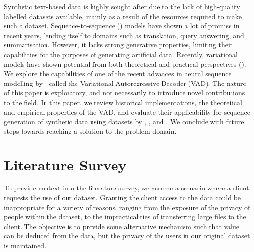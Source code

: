 \documentclass[12pt,twoside]{report}
\begin{document}
Synthetic text-based data is highly sought after due to the lack of high-quality labelled datasets available, mainly as a result of the resources required to make such a dataset.
Sequence-to-sequence (\cite{sutskever_sequence_2014}) models have shown a lot of promise in recent years, lending itself to domains such as translation, query answering, and summarisation. However, it lacks strong generative properties, limiting their capabilities for the purposes of generating artificial data.
Recently, variational models have shown potential from both theoretical and practical perspectives (\cite{kingma_auto-encoding_2013}). We explore the capabilities of one of the recent advances in neural sequence modelling by \cite{du_variational_2018}, called the Variational Autoregressive Decoder (VAD). The nature of this paper is exploratory, and not necessarily to introduce novel contributions to the field. In this paper, we review historical implementations, the theoretical and empirical properties of the VAD, and evaluate their applicability for sequence generation of synthetic data using datasets by \cite{he_ups_2016}, \cite{lison_opensubtitles2016:_2016}, and \cite{lison_opensubtitles2016:_2016}. We conclude with future steps towards reaching a solution to the problem domain.




\chapter{Literature Survey}
\label{lit_survey}

To provide context into the literature survey, we assume a scenario where a client requests the use of our dataset. Granting the client access to the data could be inappropriate for a variety of reasons, ranging from the exposure of the privacy of people within the dataset, to the impracticalities of transferring large files to the client. The objective is to provide some alternative mechanism such that value can be deduced from the data, but the privacy of the users in our original dataset is maintained.
\end{document}
